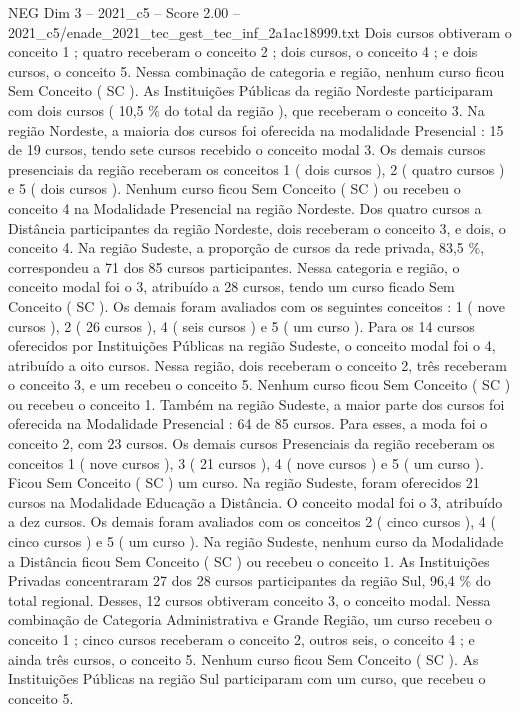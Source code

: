 \begin{textsample}{NEG Dim 3 – 2021\_c5 – Score 2.00 – 2021\_c5/enade\_2021\_tec\_gest\_tec\_inf\_2a1ac18999.txt}
Dois cursos obtiveram o conceito 1 ; quatro receberam o conceito 2 ; dois cursos, o conceito 4 ; e dois cursos, o conceito 5.
Nessa combinação de categoria e região, nenhum curso ficou Sem Conceito ( SC ).
As Instituições Públicas da região Nordeste participaram com dois cursos ( 10,5 \% do total da região ), que receberam o conceito 3.
Na região Nordeste, a maioria dos cursos foi oferecida na modalidade Presencial : 15 de 19 cursos, tendo sete cursos recebido o conceito modal 3.
Os demais cursos presenciais da região receberam os conceitos 1 ( dois cursos ), 2 ( quatro cursos ) e 5 ( dois cursos ).
Nenhum curso ficou Sem Conceito ( SC ) ou recebeu o conceito 4 na Modalidade Presencial na região Nordeste.
Dos quatro cursos a Distância participantes da região Nordeste, dois receberam o conceito 3, e dois, o conceito 4.
Na região Sudeste, a proporção de cursos da rede privada, 83,5 \%, correspondeu a 71 dos 85 cursos participantes.
Nessa categoria e região, o conceito modal foi o 3, atribuído a 28 cursos, tendo um curso ficado Sem Conceito ( SC ).
Os demais foram avaliados com os seguintes conceitos : 1 ( nove cursos ), 2 ( 26 cursos ), 4 ( seis cursos ) e 5 ( um curso ).
Para os 14 cursos oferecidos por Instituições Públicas na região Sudeste, o conceito modal foi o 4, atribuído a oito cursos.
Nessa região, dois receberam o conceito 2, três receberam o conceito 3, e um recebeu o conceito 5.
Nenhum curso ficou Sem Conceito ( SC ) ou recebeu o conceito 1.
Também na região Sudeste, a maior parte dos cursos foi oferecida na Modalidade Presencial : 64 de 85 cursos.
Para esses, a moda foi o conceito 2, com 23 cursos.
Os demais cursos Presenciais da região receberam os conceitos 1 ( nove cursos ), 3 ( 21 cursos ), 4 ( nove cursos ) e 5 ( um curso ).
Ficou Sem Conceito ( SC ) um curso.
Na região Sudeste, foram oferecidos 21 cursos na Modalidade Educação a Distância.
O conceito modal foi o 3, atribuído a dez cursos.
Os demais foram avaliados com os conceitos 2 ( cinco cursos ), 4 ( cinco cursos ) e 5 ( um curso ).
Na região Sudeste, nenhum curso da Modalidade a Distância ficou Sem Conceito ( SC ) ou recebeu o conceito 1.
As Instituições Privadas concentraram 27 dos 28 cursos participantes da região Sul, 96,4 \% do total regional.
Desses, 12 cursos obtiveram conceito 3, o conceito modal.
Nessa combinação de Categoria Administrativa e Grande Região, um curso recebeu o conceito 1 ; cinco cursos receberam o conceito 2, outros seis, o conceito 4 ; e ainda três cursos, o conceito 5.
Nenhum curso ficou Sem Conceito ( SC ).
As Instituições Públicas na região Sul participaram com um curso, que recebeu o conceito 5.

\end{textsample}

